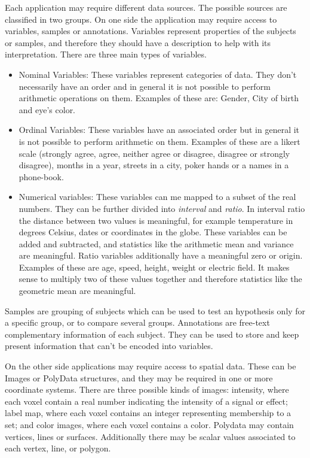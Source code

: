 Each application may require different data sources. The possible sources are classified in two groups. On one side the application may require access to variables, samples or annotations. 
Variables represent properties of the subjects or samples, and therefore they should have a description to help with its interpretation. There are three main types of variables.
\begin{itemize}
\item Nominal Variables: These variables represent categories of data. They don't necessarily have an order and in general it is not possible to perform arithmetic operations on them. Examples of these are: Gender, City of birth and eye's color.
\item Ordinal Variables: These variables have an associated order but in general it is not possible to perform arithmetic on them. Examples of these are a likert scale (strongly agree, agree, neither agree or disagree, disagree or strongly disagree), months in a year, streets in a city, poker hands or a names in a phone-book.
\item Numerical variables: These variables can me mapped to a subset of the real numbers. They can be further divided into \emph{interval} and  \emph{ratio}. In interval ratio the distance between two values is meaningful, for example temperature in degrees Celsius, dates or coordinates in the globe. These variables can be added and subtracted, and statistics like the arithmetic mean and variance are meaningful. Ratio variables additionally have a meaningful zero or origin. Examples of these are age, speed, height, weight or electric field. It makes sense to multiply two of these values together and therefore statistics like the geometric mean are meaningful.
\end{itemize}

Samples are grouping of subjects which can be used to test an hypothesis only for a specific group, or to compare several groups. Annotations are free-text complementary information of each subject. They can be used to store and keep present information that can't be encoded into variables.

On the other side applications may require access to spatial data. These can be Images or PolyData structures, and they may be required in one or more coordinate systems. There are three possible kinds of images: intensity, where each voxel contain a real number indicating the intensity of a signal or effect; label map, where each voxel contains an integer representing membership to a set; and color images, where each voxel contains a color. Polydata may contain vertices, lines or surfaces. Additionally there may be scalar values associated to each vertex, line, or polygon. 

